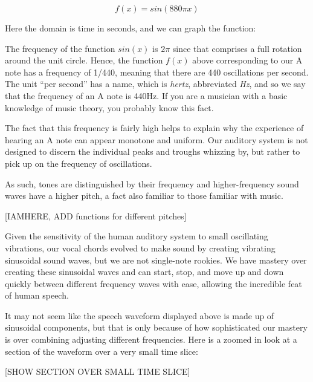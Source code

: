 \documentclass[UTF8]{book}
\begin{document}
\begin{CJK}{UTF8}{gbsn}
\[ f(x) = sin(880\pi x) \]

Here the domain is time in seconds, and we can graph the function:


The frequency of the function $sin(x)$ is $2\pi$ since that comprises a full rotation around the unit circle. Hence, the function $f(x)$ above corresponding to our A note has a frequency of 1/440, meaning that there are 440 oscillations per second. The unit ``per second'' has a name, which is \emph{hertz}, abbreviated \emph{Hz}, and so we say that the frequency of an A note is 440Hz. If you are a musician with a basic knowledge of music theory, you probably know this fact.

The fact that this frequency is fairly high helps to explain why the experience of hearing an A note can appear monotone and uniform. Our auditory system is not designed to discern the individual peaks and troughs whizzing by, but rather to pick up on the frequency of oscillations.

As such, tones are distinguished by their frequency and higher-frequency sound waves have a higher pitch, a fact also familiar to those familiar with music.

[IAMHERE, ADD functions for different pitches]

Given the sensitivity of the human auditory system to small oscillating vibrations, our vocal chords evolved to make sound by creating vibrating sinusoidal sound waves, but we are not single-note rookies. We have mastery over creating these sinusoidal waves and can start, stop, and move up and down quickly between different frequency waves with ease, allowing the incredible feat of human speech.

It may not seem like the speech waveform displayed above is made up of sinusoidal components, but that is only because of how sophisticated our mastery is over combining adjusting different frequencies. Here is a zoomed in look at a section of the waveform over a very small time slice:

[SHOW SECTION OVER SMALL TIME SLICE]


\end{CJK}
\end{document}
